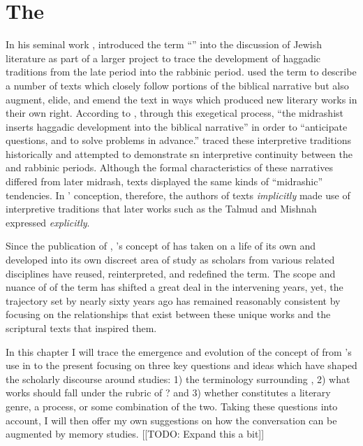 
\hypertarget{the-rwb}{%
\chapter{The \RwB}\label{the-rwb}} 

 In his seminal work , \Vermes introduced the term ``\rwB'' into the discussion of \secondtemple Jewish literature as part of a larger project to trace the development of haggadic traditions from the late \secondtemple period into the rabbinic period. \vermes used the term \rwB to describe a number of texts which closely follow portions of the biblical narrative but also augment, elide, and emend the text in ways which produced new literary works in their own right. According to \vermes, through this exegetical process, ``the midrashist inserts haggadic development into the biblical narrative'' in order to ``anticipate questions, and to solve problems in advance.''\autocites[95]{vermes1961}[see also][]{vermes_zsengeller2014} \vermes traced these interpretive traditions historically and attempted to demonstrate sn interpretive continuity between the \secondtemple and rabbinic periods. Although the formal characteristics of these narratives differed from later midrash, \rwB texts displayed the same kinds of ``midrashic'' tendencies. In \vermes' conception, therefore, the authors of \rwB texts \emph{implicitly} made use of interpretive traditions that later works such as the Talmud and Mishnah expressed \emph{explicitly}. 

 Since the publication of , \vermes's concept of \rwB has taken on a life of its own and developed into its own discreet area of study as scholars from various related disciplines have reused, reinterpreted, and redefined the term. The scope and nuance of of the term \rwB has shifted a great deal in the intervening years, yet, the trajectory set by \vermes nearly sixty years ago has remained reasonably consistent by focusing on the relationships that exist between these unique works and the scriptural texts that inspired them. 

 In this chapter I will trace the emergence and evolution of the concept of \rwB from \vermes's use in  to the present focusing on three key questions and ideas which have shaped the scholarly discourse around \rwB studies: 1) the terminology surrounding \rwB, 2) what works should fall under the rubric of \rwB? and 3) whether \rwB constitutes a literary genre, a process, or some combination of the two. Taking these questions into account, I will then offer my own suggestions on how the \rwb conversation can be augmented by memory studies. [[TODO: Expand this a bit]]

